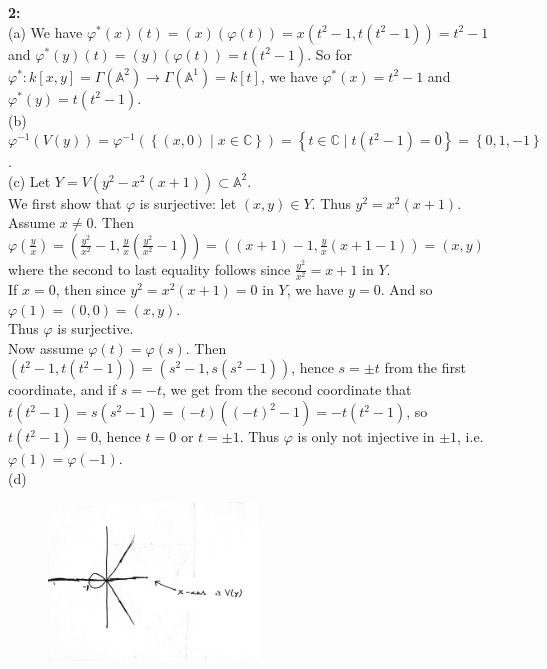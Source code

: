\documentclass[a4paper]{article}
\begin{document}
     \textbf{2:}\\
     (a) We have $\varphi^{*} (x) (t) = (x) \left( \varphi(t) \right) 
     = x \left( t^2 - 1, t \left( t^2 -1 \right)  \right) = t^2 - 1$ and
     $\varphi^{*}(y) (t) = (y) (\varphi(t))
     = t \left( t^2 - 1 \right) $. 
     So for $\varphi^{*}  \colon 
     k\left[ x,y \right] = \Gamma \left( \mathbb{A}^2 \right) \to 
     \Gamma \left( \mathbb{A}^{1} \right) = k\left[ t \right] $, we have
     $\varphi^{*}(x) = t^2 - 1$ and $\varphi^{*}(y) = t \left( t^2 -1 \right)
     $.\\
     \linebreak
     (b) 
     $\varphi^{-1} \left( V(y) \right) 
     = \varphi^{-1}\left( \left\{ (x,0)  \mid x \in \mathbb{C} \right\}  \right)
     = \left\{ t \in \mathbb{C}  \mid t \left( t^2 -1 \right) = 0 \right\} 
     = \left\{ 0, 1, -1 \right\} $.\\
     \linebreak
     (c) Let $Y = V\left( y^2 - x^2 (x+1) \right) \subset \mathbb{A}^2$.\\
     We first show that $\varphi$ is surjective: 
     let $(x,y) \in Y$. Thus $y^2 = x^2 (x+1)$. Assume $x \neq 0$. Then
     $\varphi (\frac{y}{x}) = \left( \frac{y^2}{x^2} - 1,
     \frac{y}{x} \left( \frac{y^2}{x^2}-1 \right)  \right) 
     = \left( \left( x+1 \right) -1 , \frac{y}{x} \left( x+1-1 \right)  \right) 
     = \left( x,y \right) $ where the second to last equality follows since
     $\frac{y^2}{x^2} = x+1$ in $Y$.\\
     If $x = 0$, then since $y^2 = x^2 (x+1) = 0$ in $Y$, we have $y = 0$. And
     so $\varphi (1) = (0,0) = (x,y)$.\\
     Thus $\varphi$ is surjective.\\
     \linebreak
     Now assume $\varphi(t) = \varphi(s)$.
     Then
     $\left( t^2 -1, t\left( t^2 -1 \right)  \right) = \left( s^2 -1, s \left(
     s^2 -1\right)  \right) $, hence $s = \pm t$ from the first coordinate, and
     if $s = -t$, we get from the second coordinate that
     $t \left( t^2 -1 \right) = s \left( s^2 -1 \right) 
     = (-t) \left( (-t)^2 -1  \right) = - t \left( t^2 -1 \right) $, so
    $t \left( t^2 -1 \right) = 0$, hence $t = 0$ or $t = \pm 1$.
    Thus $\varphi$ is only not injective in 
    $\pm 1$, i.e. $\varphi (1) = \varphi(-1)$.\\
    \linebreak
    (d) 
    
    \begin{figure}[h]
        \centering
        \includegraphics[width=0.5\textwidth]{2d.jpg}
        \label{fig:2d-jpg}
    \end{figure}
\end{document}
